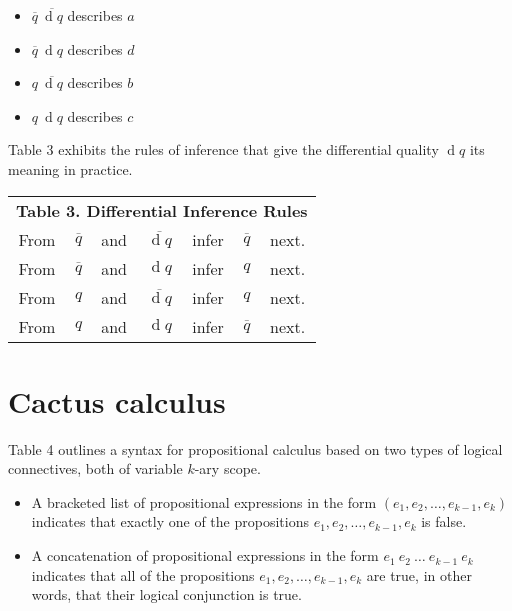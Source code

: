 \documentclass[12pt]{article}
\begin{document}
\begin{itemize}
\item
$\overline{q}\ \overline{\operatorname{d}q}$ describes $a$
\item
$\overline{q}\ \operatorname{d}q$ describes $d$
\item
$q\ \overline{\operatorname{d}q}$ describes $b$
\item
$q\ \operatorname{d}q$ describes $c$
\end{itemize}

Table 3 exhibits the rules of inference that give the differential quality $\operatorname{d}q$ its meaning in practice.

\begin{center}\begin{tabular}{ccccccc}
\multicolumn{7}{c}{\textbf{Table 3.  Differential Inference Rules}} \\[12pt]
From & $\overline{q}$ & and & $\overline{\operatorname{d}q}$ & infer & $\overline{q}$ & next. \\[6pt]
From & $\overline{q}$ & and & $\operatorname{d}q$ & infer & $q$ & next. \\[6pt]
From & $q$ & and & $\overline{\operatorname{d}q}$ & infer & $q$ & next. \\[6pt]
From & $q$ & and & $\operatorname{d}q$ & infer & $\overline{q}$ & next. \\[6pt]
\end{tabular}\end{center}

\section{Cactus calculus}

Table 4 outlines a syntax for propositional calculus based on two types of logical connectives, both of variable $k$-ary scope.

\begin{itemize}

\item
A bracketed list of propositional expressions in the form $(e_1, e_2, \ldots, e_{k-1}, e_k)$ indicates that exactly one of the propositions $e_1, e_2, \ldots, e_{k-1}, e_k$ is false.

\item
A concatenation of propositional expressions in the form $e_1\ e_2\ \ldots\ e_{k-1}\ e_k$ indicates that all of the propositions $e_1, e_2, \ldots, e_{k-1}, e_k$ are true, in other words, that their logical conjunction is true.

\end{itemize}
\end{document}
